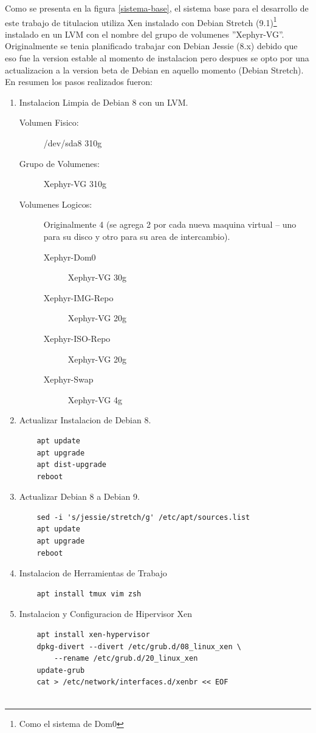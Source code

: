 Como se presenta en la figura \ref{sistema-base}, el sistema base para el desarrollo de este trabajo de titulacion utiliza Xen instalado con Debian Stretch (9.1)\footnote{Como el sistema de Dom0} instalado en un LVM con el nombre del grupo de volumenes ''Xephyr-VG''. Originalmente se tenia planificado trabajar con Debian Jessie (8.x) debido que eso fue la version estable al momento de instalacion pero despues se opto por una actualizacion a la version beta de Debian en aquello momento (Debian Stretch). En resumen los pasos realizados fueron:
\lstset{language=Bash}
\begin{enumerate}
	\item Instalacion Limpia de Debian 8 con un LVM.
    	\begin{description}
    		\item[Volumen Fisico:] /dev/sda8 310g 
            \item[Grupo de Volumenes:] Xephyr-VG 310g
            \item[Volumenes Logicos:] Originalmente 4 (se agrega 2 por cada nueva maquina virtual -- uno para su disco y otro para su area de intercambio).
            \begin{description}
            	\item[Xephyr-Dom0] Xephyr-VG 30g
                \item[Xephyr-IMG-Repo] Xephyr-VG 20g
                \item[Xephyr-ISO-Repo] Xephyr-VG 20g
                \item[Xephyr-Swap] Xephyr-VG 4g
            \end{description}
    	\end{description}
    \item Actualizar Instalacion de Debian 8.
    	\begin{lstlisting}
    apt update
    apt upgrade
    apt dist-upgrade
    reboot
        \end{lstlisting}
    \item Actualizar Debian 8 a Debian 9.
        \begin{lstlisting}
    sed -i 's/jessie/stretch/g' /etc/apt/sources.list
    apt update
    apt upgrade
    reboot
        \end{lstlisting}
    \item Instalacion de Herramientas de Trabajo
        \begin{lstlisting}
    apt install tmux vim zsh
        \end{lstlisting}
    \item Instalacion y Configuracion de Hipervisor Xen
		\begin{lstlisting}
    apt install xen-hypervisor
    dpkg-divert --divert /etc/grub.d/08_linux_xen \
    	--rename /etc/grub.d/20_linux_xen
    update-grub
    cat > /etc/network/interfaces.d/xenbr << EOF


\end{lstlisting}
\end{enumerate}

